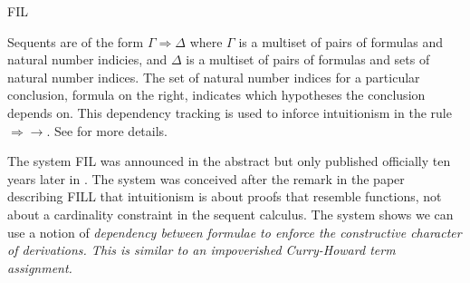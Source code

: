 \begin{entry}{FIL}

\begin{clarifications}
Sequents are of the form $\Gamma \Rightarrow \Delta$ where $\Gamma$ is
a multiset of pairs of formulas and natural number indicies, and
$\Delta$ is a multiset of pairs of formulas and sets of natural number
indices.  The set of natural number indices for a particular
conclusion, formula on the right, indicates which hypotheses the
conclusion depends on.  This dependency tracking is used to inforce
intuitionism in the rule $\Rightarrow \to$.  See \cite{dePaiva:2005}
for more details.
\end{clarifications}

\begin{history}
The system FIL was announced in the abstract \cite{dePaiva:1995} but
only published officially ten years later in \cite{dePaiva:2005}.  The
system was conceived after the remark in the paper describing
FILL  that intuitionism is about proofs that resemble
functions, not about a cardinality constraint in the sequent
calculus. The system shows we can use a notion of \em{dependency
between formulae} to enforce the constructive character of
derivations. This is similar to an impoverished Curry-Howard term
assignment.
\end{history}


%
%
%
%
%
%
% 
%




\end{entry}
